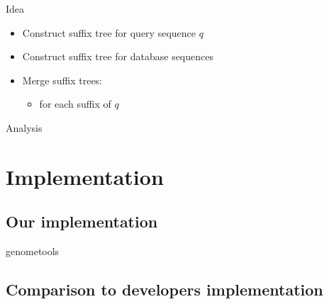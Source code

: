 \documentclass[aspectratio=1610]{beamer}
\begin{document}
\begin{frame}{Idea}
  \begin{itemize}
    \item Construct suffix tree for query sequence $q$
    \item Construct suffix tree for database sequences
    \item Merge suffix trees:
      \begin{itemize}
        \item for each suffix of $q$
      \end{itemize}
  \end{itemize}
\end{frame}

\begin{frame}{Analysis}
\end{frame}

\section{Implementation}

\subsection{Our implementation}

\begin{frame}{genometools}
\end{frame}

\subsection{Comparison to developers implementation}

\begin{frame}{}
\end{frame}
\end{document}
